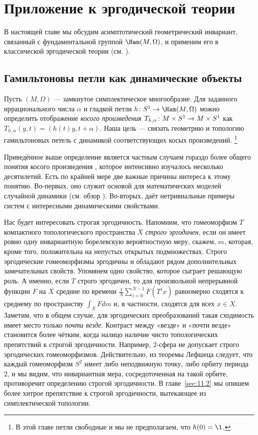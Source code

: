 \chapter[Эргодическая теория]{Приложение к эргодической теории}\label{chap:11}

В настоящей главе мы обсудим асимптотический геометрический инвариант,
связанный с фундаментальной группой $\Ham(M, \Omega)$, и применим его
в классической эргодической теории (см. \cite{P9}). 

\section[Гамильтоновы петли и динамика]{Гамильтоновы петли как динамические объекты}\label{sec:11.1}

Пусть $(M,\Omega)$ — замкнутое симплектическое многообразие.
Для заданного иррационального числа $\alpha$ и гладкой петли $h\:S^1\z\to\Ham(M,\Omega)$ можно определить отображение \emph{косого произведения} $T_{h,\alpha} \: M \times S^1 \z\to M\times S^1$ как $T_{h,\alpha}(y,t)=(h(t)y,t+\alpha)$.
Наша цель — связать геометрию и топологию гамильтоновых петель с динамикой соответствующих косых произведений.%
\footnote{В этой главе петли свободные и мы не предполагаем, что $h(0) = \1$.}

Приведённое выше определение является частным случаем гораздо более
общего понятия косого произведения  \cite[с. 231]{CFS}, которое
интенсивно изучалось несколько десятилетий. 
Есть по крайней мере две важные причины интереса к этому понятию.
Во-первых, оно служит основой для математических моделей случайной
динамики (см. обзор \cite{Ki}). 
Во-вторых, даёт нетривиальные примеры систем с интересными
динамическими свойствами. 

Нас будет интересовать строгая эргодичность.
Напомним, что гомеоморфизм $T$ компактного топологического пространства $X$ \emph{строго эргодичен}, если он имеет ровно одну инвариантную борелевскую вероятностную меру, скажем, $m$, которая, кроме того, положительна на непустых открытых подмножествах. 
Строго эргодические гомеоморфизмы эргодичны и обладают рядом
дополнительных замечательных свойств. 
Упомянем одно свойство, которое сыграет решающую роль.
А именно, если $T$ строго эргодичен, то для произвольной непрерывной
функции $F$ на $X$ средние по времени
$\tfrac1N\sum_{i=0}^{N-1}F(T^ix)$ равномерно сходятся к среднему по
пространству $\int_XFdm$ и, в частности, сходятся для всех $x \in X$. 
Заметим, что в общем случае, для эргодических преобразований такая сходимость
имеет место только {}\emph{почти везде}. 
Контраст между «везде» и «почти везде» становится более чётким, когда
налицо наличие чисто топологических препятствий к строгой
эргодичности. 
Например, 2-сфера не допускает строго эргодических гомеоморфизмов.
Действительно, из теоремы Лефшеца следует, что каждый гомеоморфизм
$S^2$ имеет либо неподвижную точку, либо орбиту периода $2$, и мы
видим, что инвариантная мера, сосредоточенная на такой орбите,
противоречит определению строгой эргодичности. 
В главе~\ref{sec:11.2} мы опишем более хитрое препятствие к строгой
эргодичности, вытекающее из симплектической топологии. 

